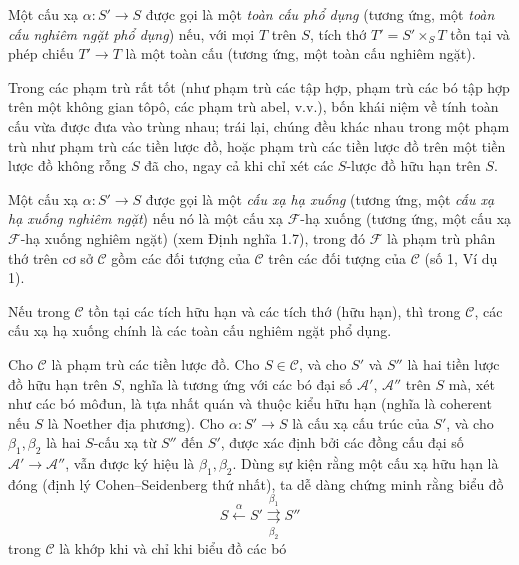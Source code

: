  Một cấu xạ $\alpha:S'\longrightarrow S$ được gọi là
một \emph{toàn cấu phổ dụng} (tương ứng, một \emph{toàn cấu nghiêm ngặt phổ
dụng}) nếu, với mọi $T$ trên $S$, tích thớ $T'=S'\times_ST$ tồn tại và phép
chiếu $T'\longrightarrow T$ là một toàn cấu (tương ứng, một toàn cấu nghiêm
ngặt).

Trong các phạm trù rất tốt (như phạm trù các tập hợp, phạm trù các bó tập hợp
trên một không gian tôpô, các phạm trù abel, v.v.), bốn khái niệm về tính toàn
cấu vừa được đưa vào trùng nhau; trái lại, chúng đều khác nhau trong một phạm
trù như phạm trù các tiền lược đồ, hoặc phạm trù các tiền lược đồ trên một tiền
lược đồ không rỗng $S$ đã cho, ngay cả khi chỉ xét các $S$-lược đồ hữu hạn trên
$S$.

 Một cấu xạ $\alpha:S'\longrightarrow S$ được gọi là
một \emph{cấu xạ hạ xuống} (tương ứng, một \emph{cấu xạ hạ xuống nghiêm
ngặt}) nếu nó là một cấu xạ $\mathcal F$-hạ xuống (tương ứng, một cấu xạ
$\mathcal F$-hạ xuống nghiêm ngặt) (xem Định nghĩa 1.7), trong đó $\mathcal F$
là phạm trù phân thớ trên cơ sở $\mathcal C$ gồm các đối tượng của
$\mathcal C$ trên các đối tượng của $\mathcal C$ (số 1, Ví dụ 1).

 Nếu trong $\mathcal C$ tồn tại các tích hữu hạn và các
tích thớ (hữu hạn), thì trong $\mathcal C$, các cấu xạ hạ xuống chính là các
toàn cấu nghiêm ngặt phổ dụng.

 Cho $\mathcal C$ là phạm trù các tiền lược đồ. Cho
$S\in\mathcal C$, và cho $S'$ và $S''$ là hai tiền lược đồ hữu hạn trên $S$,
nghĩa là tương ứng với các bó đại số $\mathcal A'$, $\mathcal A''$ trên $S$
mà, xét như các bó môđun, là tựa nhất quán và thuộc kiểu hữu hạn (nghĩa là
coherent nếu $S$ là Noether địa phương). Cho $\alpha:S'\longrightarrow S$ là
cấu xạ cấu trúc của $S'$, và cho $\beta_1,\beta_2$ là hai $S$-cấu xạ từ $S''$
đến $S'$, được xác định bởi các đồng cấu đại số
$\mathcal A'\longrightarrow\mathcal A''$, vẫn được ký hiệu là
$\beta_1,\beta_2$. Dùng sự kiện rằng một cấu xạ hữu hạn là đóng (định lý
Cohen--Seidenberg thứ nhất), ta dễ dàng chứng minh rằng biểu đồ
\[
  \tag{+}
  S\xleftarrow{\alpha}S'
  \overset{\beta_1}{\underset{\beta_2}{\rightrightarrows}}S''
\]
trong $\mathcal C$ là khớp khi và chỉ khi biểu đồ các bó

